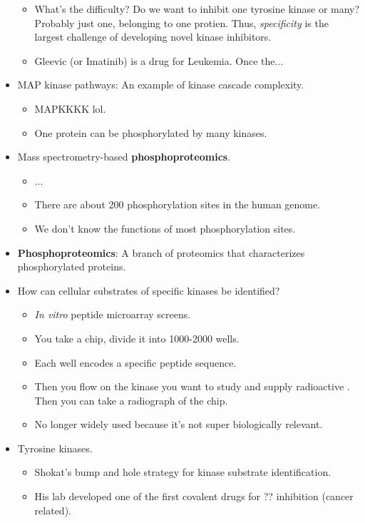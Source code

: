 \documentclass[../notes.tex]{subfiles}
\begin{document}
\begin{itemize}
\begin{itemize}
        \item What's the difficulty? Do we want to inhibit one tyrosine kinase or many? Probably just one, belonging to one protien. Thus, \emph{specificity} is the largest challenge of developing novel kinase inhibitors.
        \item Gleevic (or Imatinib) is a drug for Leukemia. Once the...
    \end{itemize}
    \item MAP kinase pathways: An example of kinase cascade complexity.
    \begin{itemize}
        \item MAPKKKK lol.
        \item One protein can be phosphorylated by many kinases.
    \end{itemize}
    \item Mass spectrometry-based \textbf{phosphoproteomics}.
    \begin{itemize}
        \item ...
        \item There are about 200 phosphorylation sites in the human genome.
        \item We don't know the functions of most phosphorylation sites.
    \end{itemize}
    \item \textbf{Phosphoproteomics}: A branch of proteomics that characterizes phosphorylated proteins.
    \item How can cellular substrates of specific kinases be identified?
    \begin{itemize}
        \item \emph{In vitro} peptide microarray screens.
        \item You take a chip, divide it into 1000-2000 wells.
        \item Each well encodes a specific peptide sequence.
        \item Then you flow on the kinase you want to study and supply radioactive . Then you can take a radiograph of the chip.
        \item No longer widely used because it's not super biologically relevant.
    \end{itemize}
    \item Tyrosine kinases.
    \begin{itemize}
        \item Shokat's bump and hole strategy for kinase substrate identification.
        \item His lab developed one of the first covalent drugs for ?? inhibition (cancer related).

\end{itemize}
\end{itemize}
\end{document}
